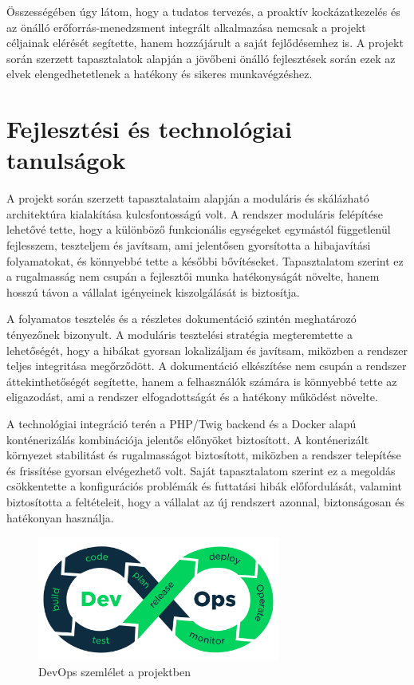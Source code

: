 Összességében úgy látom, hogy a tudatos tervezés, a proaktív kockázatkezelés és az önálló erőforrás-menedzsment
 integrált alkalmazása nemcsak a projekt céljainak elérését segítette, hanem hozzájárult a saját fejlődésemhez is. 
 A projekt során szerzett tapasztalatok alapján a jövőbeni önálló fejlesztések során ezek az elvek elengedhetetlenek a hatékony és sikeres munkavégzéshez.


\section{Fejlesztési és technológiai tanulságok}

A projekt során szerzett tapasztalataim alapján a moduláris és skálázható architektúra kialakítása kulcsfontosságú volt. 
A rendszer moduláris felépítése lehetővé tette, hogy a különböző funkcionális egységeket egymástól függetlenül fejlesszem, 
teszteljem és javítsam, ami jelentősen gyorsította a hibajavítási folyamatokat, és könnyebbé tette a későbbi bővítéseket. 
Tapasztalatom szerint ez a rugalmasság nem csupán a fejlesztői munka hatékonyságát növelte, hanem hosszú távon a vállalat igényeinek kiszolgálását is biztosítja.

A folyamatos tesztelés és a részletes dokumentáció szintén meghatározó tényezőnek bizonyult. 
A moduláris tesztelési stratégia megteremtette a lehetőségét, hogy a hibákat gyorsan lokalizáljam és javítsam, 
miközben a rendszer teljes integritása megőrződött. A dokumentáció elkészítése nem csupán a rendszer 
áttekinthetőségét segítette, hanem a felhasználók számára is könnyebbé tette az eligazodást, ami a rendszer elfogadottságát és a hatékony működést növelte.

A technológiai integráció terén a PHP/Twig backend és a Docker alapú konténerizálás kombinációja 
jelentős előnyöket biztosított. A konténerizált környezet stabilitást és rugalmasságot biztosított, 
miközben a rendszer telepítése és frissítése gyorsan elvégezhető volt. Saját tapasztalatom szerint 
ez a megoldás csökkentette a konfigurációs problémák és futtatási hibák előfordulását, 
valamint biztosította a feltételeit, hogy a vállalat az új rendszert azonnal, biztonságosan és hatékonyan használja.

\begin{figure}[H]
    \centering
    \includegraphics[width=80mm, keepaspectratio]{figures/devops.png}
    \caption{DevOps szemlélet a projektben}
    \label{fig:devops}
\end{figure}
